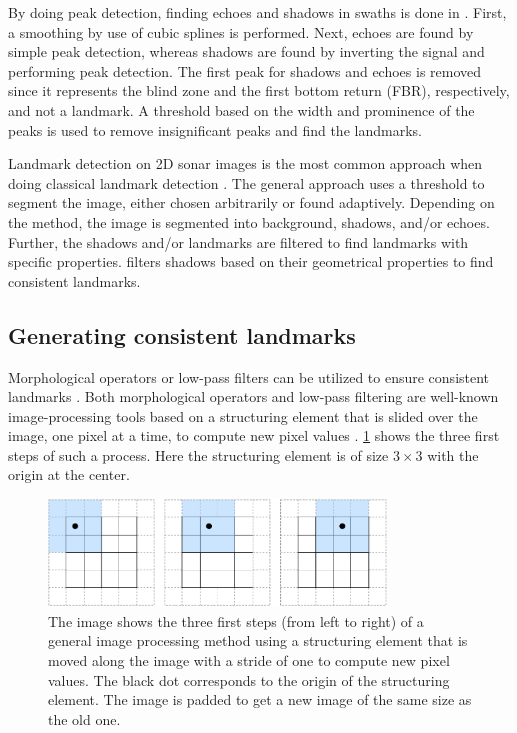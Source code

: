 By doing peak detection, finding echoes and shadows in swaths is done in \cite{Al-Rawi2017LandmarkImages}. First, a smoothing by use of cubic splines is performed. Next, echoes are found by simple peak detection, whereas shadows are found by inverting the signal and performing peak detection. The first peak for shadows and echoes is removed since it represents the blind zone and the first bottom return (FBR), respectively, and not a landmark. A threshold based on the width and prominence of the peaks is used to remove insignificant peaks and find the landmarks.  

Landmark detection on 2D sonar images is the most common approach when doing classical landmark detection \cite{Wang2017UnderwaterSonar} \cite{Siantidis2016SideVehicles} \cite{Yuan2016AnNavigation} \cite{Leblond2019SonarProject}. The general approach uses a threshold to segment the image, either chosen arbitrarily or found adaptively. Depending on the method, the image is segmented into background, shadows, and/or echoes. Further, the shadows and/or landmarks are filtered to find landmarks with specific properties. \cite{Leblond2019SonarProject} filters shadows based on their geometrical properties to find consistent landmarks. 

\subsection{Generating consistent landmarks}

Morphological operators or low-pass filters can be utilized to ensure consistent landmarks \cite{Yuan2016AnNavigation}. Both morphological operators and low-pass filtering are well-known image-processing tools based on a structuring element that is slided over the image, one pixel at a time, to compute new pixel values \cite{Gonzalez2018DigitalProcessing}. \cref{fig:image_processing_basics} shows the three first steps of such a process. Here the structuring element is of size $3\times3$ with the origin at the center. 

\begin{figure}
    \centering
    \includegraphics[width=0.8\textwidth]{figures/Image_processing_essentials.drawio.pdf}
    \caption{The image shows the three first steps (from left to right) of a general image processing method using a structuring element that is moved along the image with a stride of one to compute new pixel values. The black dot corresponds to the origin of the structuring element. The image is padded to get a new image of the same size as the old one.}
    \label{fig:image_processing_basics}
\end{figure}

